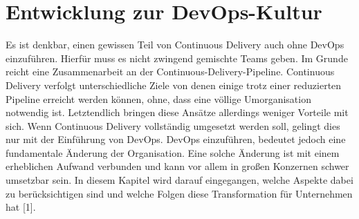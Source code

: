 \section{Entwicklung zur DevOps-Kultur} \label{entwicklung}
Es ist denkbar, einen gewissen Teil von Continuous Delivery auch ohne DevOps einzuführen. Hierfür muss es nicht zwingend gemischte Teams geben. Im Grunde reicht eine Zusammenarbeit an der Continuous-Delivery-Pipeline. Continuous Delivery verfolgt unterschiedliche Ziele von denen einige trotz einer reduzierten Pipeline erreicht werden können, ohne, dass eine völlige Umorganisation notwendig ist. Letztendlich bringen diese Ansätze allerdings weniger Vorteile mit sich. Wenn Continuous Delivery vollständig umgesetzt werden soll, gelingt dies nur mit der Einführung von DevOps. DevOps einzuführen, bedeutet jedoch eine fundamentale Änderung der Organisation. Eine solche Änderung ist mit einem erheblichen Aufwand verbunden und kann vor allem in großen Konzernen schwer umsetzbar sein. In diesem Kapitel wird darauf eingegangen, welche Aspekte dabei zu berücksichtigen sind und welche Folgen diese Transformation für Unternehmen hat [1].

